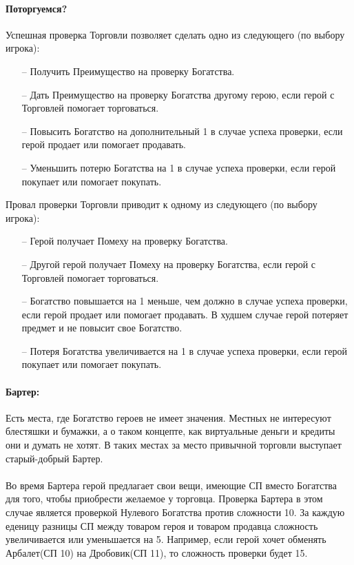 \paragraph{Поторгуемся?} Успешная проверка Торговли позволяет сделать одно из следующего (по выбору игрока):
\begin{itemize}
\item[--] Получить Преимущество на проверку Богатства.
\item[--] Дать Преимущество на проверку Богатства другому герою, если герой с Торговлей помогает торговаться.
\item[--] Повысить Богатство на дополнительный 1 в случае успеха проверки, если герой продает или помогает продавать.
\item[--] Уменьшить потерю Богатства на 1 в случае успеха проверки, если герой покупает или помогает покупать.
\end{itemize}
Провал проверки Торговли приводит к одному из следующего (по выбору игрока):
\begin{itemize}
\item[--] Герой получает Помеху на проверку Богатства.
\item[--] Другой герой получает Помеху на проверку Богатства, если герой с Торговлей помогает торговаться.
\item[--] Богатство повышается на 1 меньше, чем должно в случае успеха проверки, если герой продает или помогает продавать. В худшем случае герой потеряет предмет и не повысит свое Богатство.
\item[--] Потеря Богатства увеличивается на 1 в случае успеха проверки, если герой покупает или помогает покупать.
\end{itemize}
\paragraph{Бартер:} Есть места, где Богатство героев не имеет значения. Местных не интересуют блестяшки и бумажки, а о таком концепте, как виртуальные деньги и кредиты они и думать не хотят. В таких местах за место привычной торговли выступает старый-добрый Бартер.
\paragraph{}Во время Бартера герой предлагает свои вещи, имеющие СП вместо Богатства для того, чтобы приобрести желаемое у торговца. Проверка Бартера в этом случае является проверкой Нулевого Богатства против сложности 10. За каждую еденицу разницы СП между товаром героя и товаром продавца сложность увеличивается или уменьшается на 5. Например, если герой хочет обменять Арбалет(СП 10) на Дробовик(СП 11), то сложность проверки будет 15.
